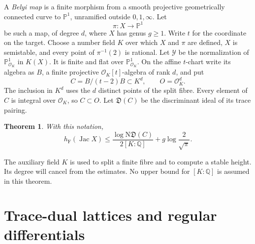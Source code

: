 \documentclass[11pt,a4paper]{article}
\newtheorem{theorem}{Theorem}[section]
\theoremstyle{definition}
\newcommand{\Q}{\mathbb Q}
\newcommand{\hF}{h_{\mathrm F}}
\newcommand{\OK}{\mathcal O_K}
\newcommand{\Jac}{\operatorname{Jac}}
\begin{document}
A \emph{Belyi map} is a finite morphism from a smooth projective
geometrically connected curve to $\mathbb P^1$, unramified outside
$0,1,\infty$. Let
\[
 \pi:X\longrightarrow\mathbb P^1
\]
be such a map, of degree $d$, where $X$ has genus $g\ge1$.
Write $t$ for the coordinate on the target.
Choose a number field $K$ over which $X$ and $\pi$ are defined,
$X$ is semistable, and every point of $\pi^{-1}(2)$ is rational.
Let $\mathcal Y$ be the normalization of $\mathbb P^1_{\OK}$ in
$K(X)$. It is finite and flat over $\mathbb P^1_{\OK}$.
On the affine $t$-chart write its algebra as $B$, a finite projective
$\OK[t]$-algebra of rank $d$, and put
\begin{equation}\label{eq:order}
 C=B/(t-2)B\subset K^d,
 \qquad O=\OK^d.
\end{equation}
The inclusion in $K^d$ uses the $d$ distinct points of the split
fibre. Every element of $C$ is integral over $\OK$, so $C\subset O$.
Let $\mathfrak D(C)$ be the discriminant ideal of its trace pairing.

\begin{theorem}\label{thm:evaluation}
With this notation,
\begin{equation}\label{eq:evaluation-bound}
 \hF(\Jac X)
 \le\frac{\log\mathrm N\mathfrak D(C)}{2[K:\Q]}
       +g\log\frac2{\sqrt\pi}.
\end{equation}
\end{theorem}

The auxiliary field $K$ is used to split a finite fibre and to
compute a stable height. Its degree will cancel from the estimates.
No upper bound for $[K:\Q]$ is assumed in this theorem.

\section{Trace-dual lattices and regular differentials}
\end{document}
